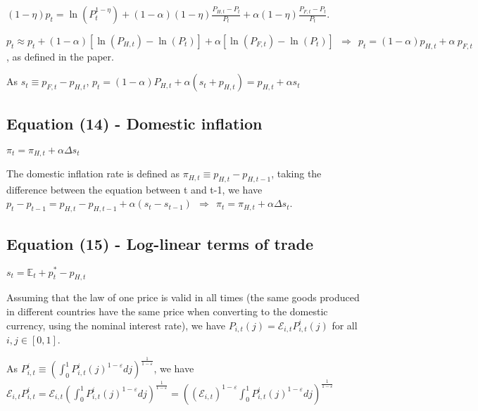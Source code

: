 \documentclass[
]{article}
\begin{document}
\(\displaystyle (1-\eta)p_t = \ln(P_t^{1-\eta}) + (1-\alpha)(1-\eta)\frac{P_{H,t}-P_t}{P_t} + \alpha(1-\eta)\frac{P_{F,t}-P_t}{P_t}\).

\(p_t \approx p_t + (1-\alpha)[\ln(P_{H,t})-\ln(P_t)] + \alpha[\ln(P_{F,t})-\ln(P_t)] \ \ \Rightarrow \ \  p_t = (1-\alpha)p_{H,t}+\alpha \ p_{F,t}\),
as defined in the paper.

As \(s_t \equiv p_{F,t}-p_{H,t}\),
\(p_t=(1-\alpha)P_{H,t}+\alpha (s_t+p_{H,t}) = p_{H,t} + \alpha s_t\)

\vspace{12pt}

\hypertarget{equation-14---domestic-inflation}{%
\subsection{Equation (14) - Domestic
inflation}\label{equation-14---domestic-inflation}}

\(\pi_t = \pi_{H,t}+\alpha \Delta s_t\)

\vspace{8pt}

The domestic inflation rate is defined as
\(\displaystyle \pi_{H,t} \equiv p_{H,t}-p_{H,t-1}\), taking the
difference between the equation between t and t-1, we have
\(p_t-p_{t-1}=p_{H,t}-p_{H,t-1}+\alpha(s_t-s_{t-1}) \ \ \Rightarrow \ \ \pi_t = \pi_{H,t}+\alpha \Delta s_t\).

\vspace{12pt}

\hypertarget{equation-15---log-linear-terms-of-trade}{%
\subsection{Equation (15) - Log-linear terms of
trade}\label{equation-15---log-linear-terms-of-trade}}

\(s_t =\mathbb{E}_t + p_t^*-p_{H,t}\)

\vspace{8pt}

Assuming that the law of one price is valid in all times (the same goods
produced in different countries have the same price when converting to
the domestic currency, using the nominal interest rate), we have
\(P_{i,t}(j) = \mathcal{E}_{i,t}P_{i,t}^i(j)\) for all
\(i, j \in [0,1]\).

As
\(P_{i,t}^i \equiv \displaystyle \left( \int_0^1 P_{i,t}^i(j)^{{1-\varepsilon}}dj \right) ^{\frac{1}{1-\varepsilon}}\),
we have
\(\displaystyle \mathcal{E}_{i,t}P_{i,t}^i = \mathcal{E}_{i,t} \left( \int_0^1 P_{i,t}^i(j)^{{1-\varepsilon}}dj \right) ^{\frac{1}{1-\varepsilon}} = \left( (\mathcal{E}_{i,t})^{1-\varepsilon} \int_0^1 P_{i,t}^i(j)^{{1-\varepsilon}}dj \right) ^{\frac{1}{1-\varepsilon}}\)
\end{document}
